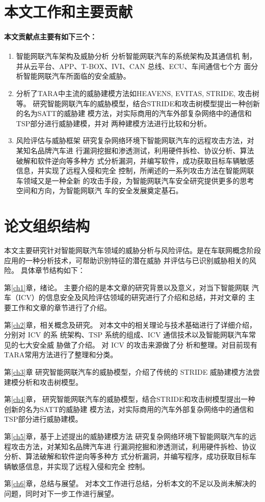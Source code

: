 \section{本文工作和主要贡献}
\paragraph{本文贡献点主要有如下三个：}

\begin{enumerate}
    \item 智能网联汽车架构及威胁分析 
    分析智能网联汽车的系统架构及其通信机
    制，并从云平台、APP、T-BOX、IVI、CAN 总线、ECU、车间通信七个方
    面分析智能网联汽车所面临的安全威胁。
    \item 分析了TARA中主流的威胁建模方法如HEAVENS, EVITAS, STRIDE, 攻击树等。
    研究智能网联汽车的威胁模型，结合STRIDE和攻击树模型提出一种创新的名为SATT的威胁建
模方法，对实际商用的汽车外部复杂网络中的通信和TSP部分进行威胁建模，并对
两种建模方法进行比较和分析。
    \item 风险评估与威胁框架
    研究复杂网络环境下智能网联汽车的远程攻击方法，对某知名品牌汽车进
行漏洞挖掘和渗透测试，利用硬件拆检、协议分析、算法破解和软件逆向等多种方
式分析漏洞，并编写软件，成功获取目标车辆敏感信息，并实现了远程入侵和完全
控制，所阐述的一系列攻击方法在智能网联车领域又是一种全新
的攻击手段，为智能网联汽车安全研究提供更多的思考空间和方向，为智能网联汽
车的安全发展奠定基石。

\end{enumerate}


\section{论文组织结构}
本文主要研究针对智能网联汽车领域的威胁分析与风险评估。是在车联网概念阶段应用的一种分析技术，可帮助识别特征的潜在威胁 并评估与已识别威胁相关的风险。
具体章节结构如下：

第\ref{ch1}章，绪论。
主要介绍的是本文章的研究背景以及意义，对当下智能网联
汽车（ICV）的信息安全及风险评估领域的研究进行了介绍和总结，并对文章的
主要工作和文章的章节进行了介绍。

第\ref{ch2}章，相关概念及研究。
对本文中的相关理论与技术基础进行了详细介绍，分别对 ICV 的系
统架构、TSP 系统的组成、ICV 通信技术以及智能网联汽车常见的七大安全威
胁做了介绍。
对 ICV 的攻击来源做了分
析和整理。对目前现有TARA常用方法进行了整理和分类。

第\ref{ch3}章
研究智能网联汽车的威胁模型，介绍了传统的 STRIDE 威胁建模方法尝建模分析和攻击树模型。

第\ref{ch4}章，
研究智能网联汽车的威胁模型，结合STRIDE和攻击树模型提出一种创新的名为SATT的威胁建
模方法，对实际商用的汽车外部复杂网络中的通信和TSP部分进行威胁建模。

第\ref{ch5}章，基于上述提出的威胁建模方法
研究复杂网络环境下智能网联汽车的远程攻击方法，对某知名品牌汽车进
行漏洞挖掘和渗透测试，利用硬件拆检、协议分析、算法破解和软件逆向等多种方
式分析漏洞，并编写程序，成功获取目标车辆敏感信息，并实现了远程入侵和完全
控制。

第\ref{ch6}章，总结与展望。
对本文工作进行总结，分析本文的不足以及尚未解决的问题，同时对下一步工作进行展望。
